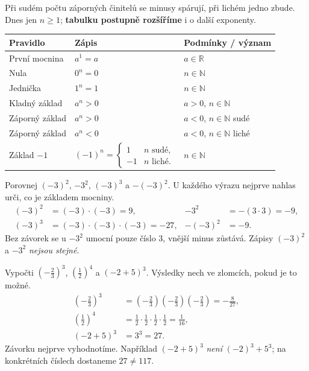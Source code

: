\documentclass[11pt,a4paper]{article}
\begin{document}
Při sudém počtu záporných činitelů se minusy spárují, při lichém
jedno zbude. Dnes jen $n\ge1$; \textbf{tabulku postupně rozšíříme}
i o další exponenty.
\begin{center}
\small
\begin{tabularx}{\linewidth}{@{}>{\raggedright\arraybackslash}p{23mm}>{\raggedright\arraybackslash}p{55mm}X@{}}
\toprule
\textbf{Pravidlo} & \textbf{Zápis} & \textbf{Podmínky / význam} \\
\midrule
První mocnina & $a^1=a$ & $a\in\mathbb R$ \\
Nula & $0^n=0$ & $n\in\mathbb N$ \\
Jednička & $1^n=1$ & $n\in\mathbb N$ \\
Kladný základ & $a^n>0$ & $a>0$, $n\in\mathbb N$ \\
Záporný základ & $a^n>0$ & $a<0$, $n\in\mathbb N$ sudé \\
Záporný základ & $a^n<0$ & $a<0$, $n\in\mathbb N$ liché \\
Základ $-1$ & $(-1)^n=\begin{cases}1&n\text{ sudé},\\[-1mm]-1&n\text{ liché}.\end{cases}$ & $n\in\mathbb N$ \\
\bottomrule
\end{tabularx}
\normalsize
\end{center}
\begin{prikladReseniBox}[title={Příklad 1},breakable=false]
Porovnej $(-3)^2$, $-3^2$, $(-3)^3$ a $-(-3)^2$.
U každého výrazu nejprve nahlas urči, co je základem mocniny.
\tcblower
\begin{align*}
 (-3)^2&=(-3)\cdot(-3)=9, & -3^2&=-(3\cdot3)=-9,\\
 (-3)^3&=(-3)\cdot(-3)\cdot(-3)=-27,& -(-3)^2&=-9.
\end{align*}
Bez závorek se u $-3^2$ umocní pouze číslo $3$, vnější minus
zůstává. Zápisy $(-3)^2$ a $-3^2$ \emph{nejsou stejné}.
\end{prikladReseniBox}

\begin{prikladReseniBox}[title={Příklad 2},breakable=false]
Vypočti $\left(-\frac23\right)^3$, $\left(\frac12\right)^4$
a $(-2+5)^3$. Výsledky nech ve zlomcích, pokud je to možné.
\tcblower
\begin{align*}
 \left(-\frac23\right)^3
 &=\left(-\frac23\right)\left(-\frac23\right)\left(-\frac23\right)
 =-\frac8{27},\\
 \left(\frac12\right)^4
 &=\frac12\cdot\frac12\cdot\frac12\cdot\frac12=\frac1{16},\\
 (-2+5)^3&=3^3=27.
\end{align*}
Závorku nejprve vyhodnotíme. Například $(-2+5)^3$ \emph{není}
$(-2)^3+5^3$; na konkrétních číslech dostaneme $27\ne117$.
\end{prikladReseniBox}
\end{document}
